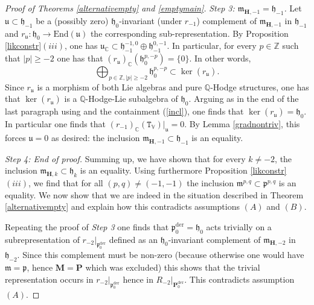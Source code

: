 \documentclass[10pt]{article}
\numberwithin{equation}{subsection}
\theoremstyle{plain}
\theoremstyle{definition}
\theoremstyle{remark}
\newcommand{\Z}{\mathbb Z}
\newcommand{\Q}{\mathbb Q}
\newcommand{\C}{\mathbb C}
\newcommand{\V}{\mathbb V}
\newcommand{\pp}{\mathbf P}
\newcommand{\mon}{\mathbf H}
\newcommand{\M}{\mathbf M}
\newcommand{\para}{\mathfrak{p}}
\newcommand{\lieu}{\mathfrak{u}}
\newcommand{\mt}{\mathfrak{m}}
\newcommand{\ort}{\mathfrak{h}}
\newcommand{\der}{\mathrm{der}}
\newcommand{\End}{\mathrm{End}}
\begin{document}
\begin{proof}[Proof of Theorems \ref{alternativempty} and \ref{emptymain}]
\textit{Step 3: $\mt_{\mon,-1} = \ort_{-1}$.} Let $\lieu \subset \ort_{-1}$ be a (possibly zero) $\ort_0$-invariant (under $r_{-1}$) complement of $\mt_{\mon,-1}$ in $\ort_{-1}$ and $r_\lieu : \ort_0 \rightarrow \End(\lieu)$ the corresponding sub-representation. By Proposition \ref{likconstr}$(iii)$, one has $\lieu_\C \subset \ort_{-1}^{-1,0} \oplus \ort_{-1}^{0,-1}$. In particular, for every $p \in \Z$ such that $|p| \geqslant -2$ one has that $(r_{\lieu})_\C(\ort_0^{p,-p}) = \{0\}$. In other words,
\begin{equation}\label{incl}
\bigoplus_{p \in \Z, |p| \geqslant -2} \ort_0^{p,-p} \subset \ker(r_{\lieu}).
\end{equation}
Since $r_{\lieu}$ is a morphism of both Lie algebras and pure $\Q$-Hodge structures, one has that $\ker(r_{\lieu})$ is a $\Q$-Hodge-Lie subalgebra of $\ort_0$. Arguing as in the end of the last paragraph using \cite[Prop. 7.5]{bku} and the containment (\ref{incl}), one finds that $\ker(r_{\lieu}) = \ort_0$. In particular one finds that $(r_{-1})_\C(\mathtt{T}_\V)\vert_\lieu = 0$. By Lemma \ref{gradnontriv}, this forces $\lieu = 0$ as desired: the inclusion $\mt_{\mon,-1} \subset \ort_{-1}$ is an equality.

\textit{Step 4: End of proof.} Summing up, we have shown that for every $k \neq -2$, the inclusion $\mt_{\mon,k} \subset \ort_k$ is an equality. Using furthermore Proposition \ref{likconstr}$(iii)$, we find that for all $(p,q) \neq (-1,-1)$ the inclusion $\mt^{p,q} \subset \para^{p,q}$ is an equality. We now show that we are indeed in the situation described in Theorem \ref{alternativempty} and explain how this contradicts assumptions $(A)$ and $(B)$.

Repeating the proof of \textit{Step 3} one finds that $\para_0^\der = \ort_0$ acts trivially on a subrepresentation of $r_{-2} \vert_{\para_0^\der}$ defined as an $\ort_0$-invariant complement of $\mt_{\mon, -2}$ in $\ort_{-2}$. Since this complement must be non-zero (because otherwise one would have $\mt = \para$, hence $\M = \pp$ which was excluded) this shows that the trivial representation occurs in $r_{-2} \vert_{\para_0^\der}$ hence in $R_{-2} \vert_{\pp_0^\der}$. This contradicts assumption $(A)$.


\end{proof}
\end{document}
